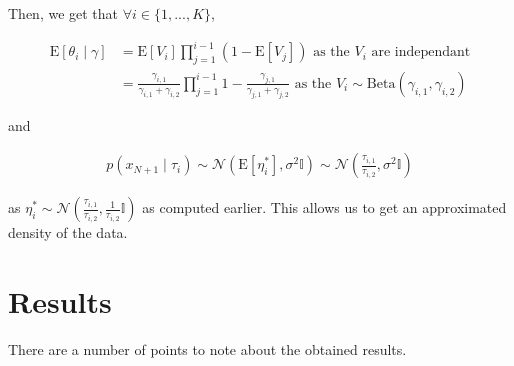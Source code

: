 \documentclass{article}
\begin{document}
Then, we get that $\forall i \in \{1,..., K\}$, 

\begin{align*}
    \mathrm{E}\left[\theta_i \mid \gamma\right] &=\mathrm{E}\left[V_i\right] \prod_{j=1}^{i-1}\left(1-\mathrm{E}[V_j]\right) \text{ as the } V_i \text{ are independant} \\
    &= \frac{\gamma_{i,1}}{\gamma_{i,1} + \gamma_{i,2}}\prod_{j=1}^{i-1}1-\frac{\gamma_{j,1}}{\gamma_{j,1}+\gamma_{j,2}} \text{ as the } V_i \sim \text{Beta}(\gamma_{i,1}, \gamma_{i,2})
\end{align*}

and 

\begin{align*}
    p\left(x_{N+1} \mid \tau_i\right) \sim \mathcal{N}\left(\mathrm{E}[\eta_i^*], \sigma^2\mathbb{I}\right) \sim \mathcal{N}\left(\frac{\tau_{i,1}}{\tau_{i,2}}, \sigma^2\mathbb{I}\right)
\end{align*}

as $\eta_i^* \sim \mathcal{N}\left(\frac{\tau_{i,1}}{\tau_{i,2}}, \frac{1}{\tau_{i,2}}\mathbb{I}\right)$ as computed earlier.
This allows us to get an approximated density of the data.

\section{Results}

There are a number of points to note about the obtained results.
\end{document}

